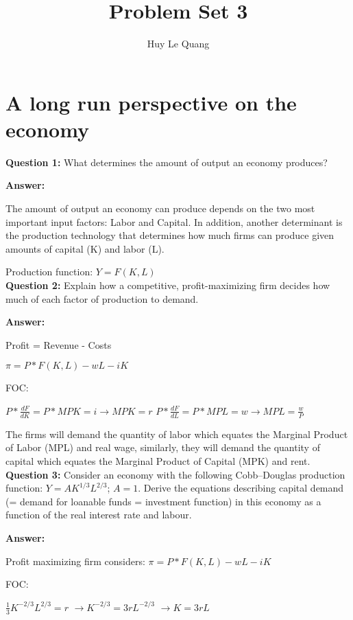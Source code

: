 \documentclass[a4paper, 11pt]{article}
\title{Problem Set 3}
\author{Huy Le Quang}
\begin{document}
\maketitle

\section {A long run perspective on the economy}

\textbf{Question 1:} What determines the amount of output an economy produces?

\textbf{Answer:} 

The amount of output an economy can produce depends on the two most important input factors: Labor and Capital. In addition, another determinant is the production technology that determines how much firms can produce given amounts of capital (K) and labor (L).

Production function: $Y = F(K,L)$ \\

\textbf{Question 2:} Explain how a competitive, profit-maximizing firm decides how much of each factor of production to demand.

\textbf{Answer:} 

Profit = Revenue - Costs

$\pi = P * F(K,L) - wL - iK$

FOC:

$P * \frac{dF}{dK} = P * MPK = i \rightarrow MPK = r$
$P * \frac{dF}{dL} = P * MPL = w \rightarrow MPL = \frac{w}{P}$

The firms will demand the quantity of labor which equates the Marginal Product of Labor (MPL) and real wage, similarly, they will demand the quantity of capital which equates the Marginal Product of Capital (MPK) and rent. \\

\textbf{Question 3:} Consider an economy with the following Cobb–Douglas production function:
$Y = AK^{1/3}L^{2/3}$; $A=1$.
Derive the equations describing capital demand (= demand for loanable funds = investment function) in this economy as a function of the real interest rate and labour.

\textbf{Answer:}

Profit maximizing firm considers:
$\pi = P * F(K,L) - wL - iK$

FOC:

$\frac{1}{3}K^{-2/3}L^{2/3} = r$
$\rightarrow K^{-2/3} = 3rL^{-2/3}$
$\rightarrow K = 3rL$ \\
\end{document}
